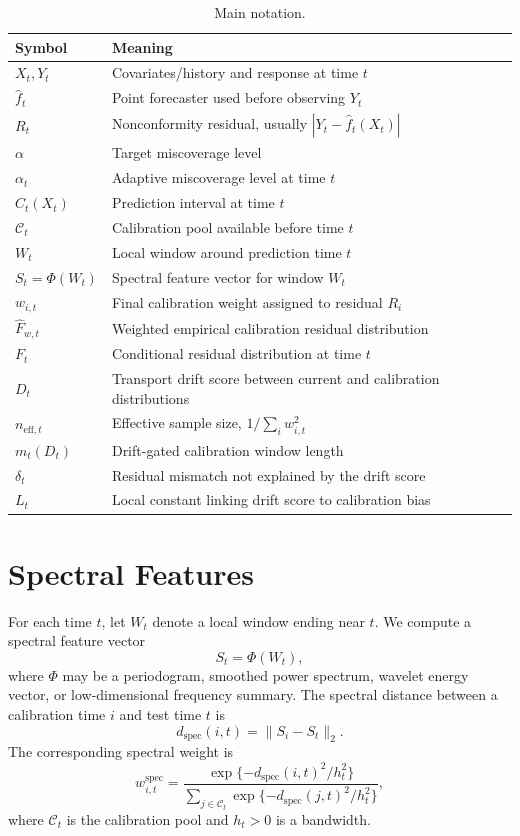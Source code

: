 \documentclass[11pt]{article}
\begin{document}
\begin{table}[t]
\centering
\caption{Main notation.}
\label{tab:notation}
\begin{tabular}{ll}
\toprule
Symbol & Meaning \\
\midrule
$X_t,Y_t$ & Covariates/history and response at time $t$ \\
$\widehat f_t$ & Point forecaster used before observing $Y_t$ \\
$R_t$ & Nonconformity residual, usually $|Y_t-\widehat f_t(X_t)|$ \\
$\alpha$ & Target miscoverage level \\
$\alpha_t$ & Adaptive miscoverage level at time $t$ \\
$C_t(X_t)$ & Prediction interval at time $t$ \\
$\mathcal{C}_t$ & Calibration pool available before time $t$ \\
$W_t$ & Local window around prediction time $t$ \\
$S_t=\Phi(W_t)$ & Spectral feature vector for window $W_t$ \\
$w_{i,t}$ & Final calibration weight assigned to residual $R_i$ \\
$\widehat F_{w,t}$ & Weighted empirical calibration residual distribution \\
$F_t$ & Conditional residual distribution at time $t$ \\
$D_t$ & Transport drift score between current and calibration distributions \\
$n_{\mathrm{eff},t}$ & Effective sample size, $1/\sum_i w_{i,t}^2$ \\
$m_t(D_t)$ & Drift-gated calibration window length \\
$\delta_t$ & Residual mismatch not explained by the drift score \\
$L_t$ & Local constant linking drift score to calibration bias \\
\bottomrule
\end{tabular}
\end{table}

\section{Spectral Features}

For each time $t$, let $W_t$ denote a local window ending near $t$. We compute a spectral feature vector
\[
    S_t = \Phi(W_t),
\]
where $\Phi$ may be a periodogram, smoothed power spectrum, wavelet energy vector, or low-dimensional frequency summary. The spectral distance between a calibration time $i$ and test time $t$ is
\[
    d_{\mathrm{spec}}(i,t) = \|S_i-S_t\|_2.
\]
The corresponding spectral weight is
\[
    w^{\mathrm{spec}}_{i,t}
    =
    \frac{\exp\{-d_{\mathrm{spec}}(i,t)^2/h_t^2\}}
    {\sum_{j\in \mathcal{C}_t}\exp\{-d_{\mathrm{spec}}(j,t)^2/h_t^2\}},
\]
where $\mathcal{C}_t$ is the calibration pool and $h_t>0$ is a bandwidth.
\end{document}
